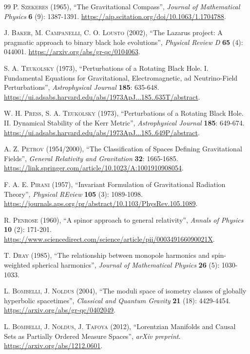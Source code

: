 \documentclass{article}
\begin{document}
\begin{thebibliography}{99}
\textsc{P. Szekeres} (1965), ``The Gravitational Compass'', \textit{Journal of Mathematical Physics} \textbf{6} (9): 1387-1391. \url{https://aip.scitation.org/doi/10.1063/1.1704788}.

\textsc{J. Baker, M. Campanelli, C. O. Lousto} (2002), ``The Lazarus project: A pragmatic approach to binary black hole evolutions'', \textit{Physical Review D} \textbf{65} (4): 044001. \url{https://arxiv.org/abs/gr-qc/0104063}.

\textsc{S. A. Teukolsky} (1973), ``Perturbations of a Rotating Black Hole. I. Fundamental Equations for Gravitational, Electromagnetic, ad Neutrino-Field Perturbations'', \textit{Astrophysical Journal} \textbf{185}: 635-648. \url{https://ui.adsabs.harvard.edu/abs/1973ApJ...185..635T/abstract}.

\textsc{W. H. Press, S. A. Teukolsky} (1973), ``Perturbations of a Rotating Black Hole. II. Dynamical Stability of the Kerr Metric'', \textit{Astrophysical Journal} \textbf{185}: 649-674. \url{https://ui.adsabs.harvard.edu/abs/1973ApJ...185..649P/abstract}.

\textsc{A. Z. Petrov} (1954/2000), ``The Classification of Spaces Defining Gravitational Fields'', \textit{General Relativity and Gravitation} \textbf{32}: 1665-1685. \url{https://link.springer.com/article/10.1023/A:1001910908054}.

\textsc{F. A. E. Pirani} (1957), ``Invariant Formulation of Gravitational Radiation Theory'', \textit{Physical REview} \textbf{105} (3): 1089-1098. \url{https://journals.aps.org/pr/abstract/10.1103/PhysRev.105.1089}.

\textsc{R. Penrose} (1960), ``A spinor approach to general relativity'', \textit{Annals of Physics} \textbf{10} (2): 171-201. \url{https://www.sciencedirect.com/science/article/pii/000349166090021X}.

\textsc{T. Dray} (1985), ``The relationship between monopole harmonics and spin-weighted spherical harmonics'', \textit{Journal of Mathematical Physics} \textbf{26} (5): 1030-1033.

\textsc{L. Bombelli, J. Noldus} (2004), ``The moduli space of isometry classes of globally hyperbolic spacetimes'', \textit{Classical and Quantum Gravity} \textbf{21} (18): 4429-4454. \url{https://arxiv.org/abs/gr-qc/0402049}.

\textsc{L. Bombelli, J. Noldus, J. Tafoya} (2012), ``Lorentzian Manifolds and Causal Sets as Partially Ordered Measure Spaces'', \textit{arXiv preprint}. \url{https://arxiv.org/abs/1212.0601}.


\end{thebibliography}
\end{document}
